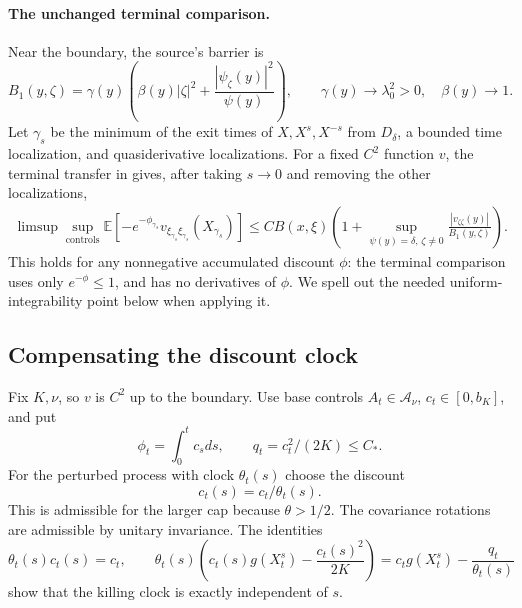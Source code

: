 \documentclass[11pt,a4paper]{article}
\theoremstyle{remark}
\begin{document}
\paragraph{The unchanged terminal comparison.}
Near the boundary, the source's barrier is
\begin{equation}
 B_1(y,\zeta)=\gamma(y)
       \left(\beta(y)|\zeta|^2+
             \frac{|\psi_\zeta(y)|^2}{\psi(y)}\right),
 \qquad \gamma(y)\longrightarrow\lambda_0^2>0,
 \quad\beta(y)\longrightarrow1.
 \label{eq:721-20}
\end{equation}
Let $\gamma_s$ be the minimum of the exit times of
$X,X^s,X^{-s}$ from $D_\delta$, a bounded time localization, and
quasiderivative localizations.  For a fixed $C^2$ function $v$, the terminal
transfer in \cite[equation (9.16)]{ZhouBellman2015} gives, after taking
$s\to0$ and removing the other localizations,
\begin{equation}
 \begin{split}
 \limsup\sup_{\text{controls}}
 \mathbb E[-e^{-\phi_{\gamma_s}}
                 v_{\xi_{\gamma_s}\xi_{\gamma_s}}(X_{\gamma_s})]
 \le CB(x,\xi)
 \left(1+\sup_{\psi(y)=\delta,\,\zeta\ne0}
               \frac{|v_{\zeta\zeta}(y)|}{B_1(y,\zeta)}\right).
 \end{split}
 \label{eq:721-21}
\end{equation}
This holds for any nonnegative accumulated discount $\phi$: the terminal
comparison uses only $e^{-\phi}\le1$, and has no derivatives of $\phi$.
We spell out the needed uniform-integrability point below when applying it.

\subsection{Compensating the discount clock}

Fix $K,\nu$, so $v$ is $C^2$ up to the boundary.  Use base controls
$A_t\in\mathcal A_\nu$, $c_t\in[0,b_K]$, and put
\[
 \phi_t=\int_0^tc_sds,\qquad q_t=c_t^2/(2K)\le C_*.
\]
For the perturbed process with clock $\theta_t(s)$ choose the discount
\begin{equation}
 c_t(s)=c_t/\theta_t(s).
 \label{eq:721-22}
\end{equation}
This is admissible for the larger cap because $\theta>1/2$.
The covariance rotations are admissible by unitary invariance.  The identities
\begin{equation}
 \theta_t(s)c_t(s)=c_t,
 \qquad
 \theta_t(s)\left(c_t(s)g(X_t^s)-\frac{c_t(s)^2}{2K}\right)
 =c_tg(X_t^s)-\frac{q_t}{\theta_t(s)}
 \label{eq:721-23}
\end{equation}
show that the killing clock is exactly independent of $s$.
\end{document}
